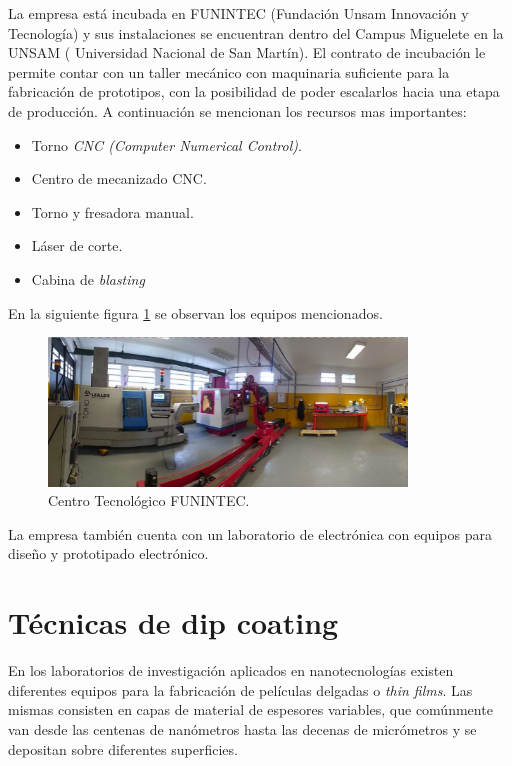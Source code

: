 La empresa está incubada en FUNINTEC (Fundación Unsam Innovación y Tecnología) y sus instalaciones se encuentran dentro del Campus Miguelete en la UNSAM ( Universidad Nacional de San Martín). El contrato de incubación le permite contar con un taller mecánico con maquinaria suficiente para la fabricación de  prototipos, con la posibilidad de poder escalarlos hacia una etapa de producción. A continuación se mencionan los recursos mas importantes:
 
\begin{itemize}
\item Torno \textit{CNC (Computer Numerical Control)}.
\item Centro de mecanizado CNC.
\item Torno y fresadora manual.
\item Láser de corte.
\item Cabina de \textit{blasting}
\end{itemize}

En la siguiente figura \ref{fig:taller} se observan los equipos mencionados.

\begin{figure}[htpb]
\centering 
\includegraphics[width=0.85\textwidth]{./Figures/taller_v3.pdf}
\caption{Centro Tecnológico FUNINTEC.}
\label{fig:taller}
\end{figure}

La empresa también cuenta con un laboratorio de electrónica con equipos para diseño y prototipado electrónico.

\section{Técnicas de dip coating}

En los laboratorios de investigación aplicados en nanotecnologías existen diferentes equipos para la fabricación de películas delgadas o \textit{thin films}. Las mismas consisten en capas de material de espesores variables, que comúnmente van desde las centenas de nanómetros hasta las decenas de micrómetros y se depositan sobre diferentes superficies.


